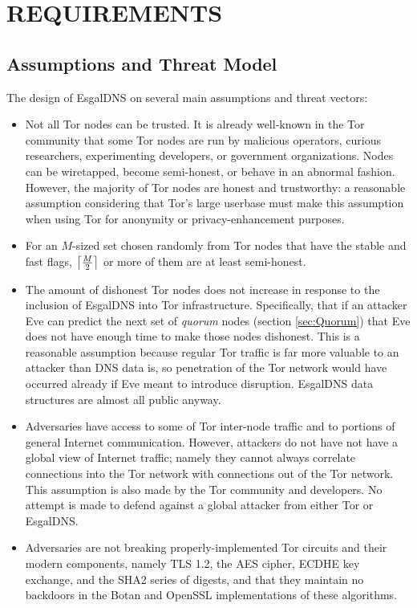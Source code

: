 
\chapter{REQUIREMENTS}

\section{Assumptions and Threat Model}

The design of EsgalDNS on several main assumptions and threat vectors:

\begin{itemize}
  \item Not all Tor nodes can be trusted. It is already well-known in the Tor community that some Tor nodes are run by malicious operators, curious researchers, experimenting developers, or government organizations. Nodes can be wiretapped, become semi-honest, or behave in an abnormal fashion. However, the majority of Tor nodes are honest and trustworthy: a reasonable assumption considering that Tor's large userbase must make this assumption when using Tor for anonymity or privacy-enhancement purposes.
  \item For an $ M $-sized set chosen randomly from Tor nodes that have the stable and fast flags, $ \ceil[\big]{\frac{M}{2}} $ or more of them are at least semi-honest.
  \item The amount of dishonest Tor nodes does not increase in response to the inclusion of EsgalDNS into Tor infrastructure. Specifically, that if an attacker Eve can predict the next set of \emph{quorum} nodes (section \ref{sec:Quorum}) that Eve does not have enough time to make those nodes dishonest. This is a reasonable assumption because regular Tor traffic is far more valuable to an attacker than DNS data is, so penetration of the Tor network would have occurred already if Eve meant to introduce disruption. EsgalDNS data structures are almost all public anyway.
  \item Adversaries have access to some of Tor inter-node traffic and to portions of general Internet communication. However, attackers do not have not have a global view of Internet traffic; namely they cannot always correlate connections into the Tor network with connections out of the Tor network. This assumption is also made by the Tor community and developers. No attempt is made to defend against a global attacker from either Tor or EsgalDNS.
  \item Adversaries are not breaking properly-implemented Tor circuits and their modern components, namely TLS 1.2, the AES cipher, ECDHE key exchange, and the SHA2 series of digests, and that they maintain no backdoors in the Botan and OpenSSL implementations of these algorithms.
\end{itemize}

